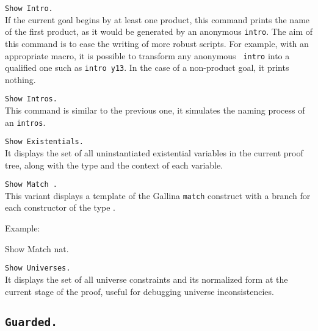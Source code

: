 \begin{Variants}
\item{\tt Show Intro.}\\
If the current goal begins by at least one product, this command
prints the name of the first product, as it would be generated by 
an anonymous {\tt intro}. The aim of this command is to ease the
writing of more robust scripts. For example, with an appropriate 
{\ProofGeneral} macro, it is possible to transform any anonymous {\tt
  intro} into a qualified one such as {\tt intro y13}.
In the case of a non-product goal, it prints nothing. 

\item{\tt Show Intros.}\\
This command is similar to the previous one, it simulates the naming 
process of an {\tt intros}.

\item{\tt Show Existentials.\label{ShowExistentials}}
\\ It displays
the set of all uninstantiated existential variables in the current proof tree, 
along with the type and the context of each variable.

\item{\tt Show Match {\ident}.\label{ShowMatch}}\\
This variant displays a template of the Gallina {\tt match} construct 
with a branch for each constructor of the type {\ident}.

Example:

\begin{coq_example}
Show Match nat.  
\end{coq_example}
\begin{ErrMsgs}
\item {}
\end{ErrMsgs}

\item{\tt Show Universes.\label{ShowUniverses}}
\\ It displays the set of all universe constraints and its
normalized form at the current stage of the proof, useful for
debugging universe inconsistencies.

\end{Variants}


\subsection[\tt Guarded.]{\tt Guarded.\label{Guarded}}

